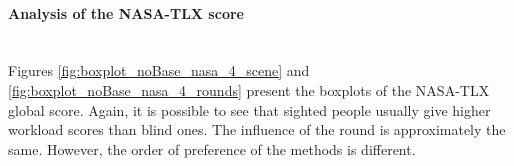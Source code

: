 


\paragraph*{Analysis of the NASA-TLX score}\mbox{}\\

%
%
%
%

Figures \ref{fig:boxplot_noBase_nasa_4_scene} and \ref{fig:boxplot_noBase_nasa_4_rounds} present the boxplots of the NASA-TLX global score. Again, it is possible to see that sighted people usually give higher workload scores than blind ones. The influence of the round is approximately the same. However, the order of preference of the methods is different.

